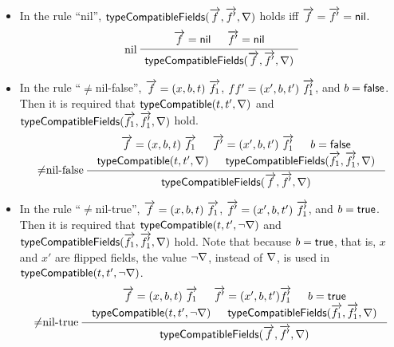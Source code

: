 \begin{itemize}
\begin{gather*}
{\begin{array}{c}
		\end{array}
		}	
	\end{gather*}
	\item In the rule ``nil'', ${\sf typeCompatibleFields}(\overrightarrow{f}, \overrightarrow{f'}, \nabla)$ holds iff $\overrightarrow{f} = \overrightarrow{f'} = {\sf nil}$. 
	\begin{gather*}
		\infer[nil]
		{\typecompatiblefields(\myvec{f}, \myvec{f'}, \flipped)}
		{
			\begin{array}{c}
				\myvec{f} = \nil \hspace{15pt} \myvec{f'} = \nil
			\end{array}
		}	
	\end{gather*}
	\item In the rule ``$\neq$nil-false'', $\overrightarrow{f} = (x, b, t)\ \overrightarrow{f_1}$, $ff' = (x', b, t')\ \overrightarrow{f'_1}$, and $b = {\sf false}$. Then it is required that ${\sf typeCompatible}(t, t', \nabla)$ and ${\sf typeCompatibleFields}(\overrightarrow{f_1}, \overrightarrow{f'_1}, \nabla)$ hold. 
	\begin{gather*}
		\infer[$\neq$nil-false]
		{\typecompatiblefields(\myvec{f}, \myvec{f'}, \flipped)}
		{
			\begin{array}{c}
				\myvec{f} = (x, b, t)\ \myvec{f_1} \hspace{15pt} \myvec{f'} = (x', b, t')\ \myvec{f'_1} \hspace{15pt} b = \lfalse \\
				\typecompatible(t, t', \flipped) \hspace{15pt}
				\typecompatiblefields(\myvec{f_1}, \myvec{f'_1}, \flipped)
			\end{array}
		}	
	\end{gather*}
	\item In the rule ``$\neq$nil-true'', $\overrightarrow{f} = (x, b, t)\ \overrightarrow{f_1}$, $\myvec{f'} = (x', b, t')\ \myvec{f'_1}$, and $b = {\sf true}$. Then it is required that ${\sf typeCompatible}(t, t', \neg \nabla)$ and ${\sf typeCompatibleFields}(\overrightarrow{f_1}, \overrightarrow{f'_1}, \nabla)$  hold. Note that because $b = {\sf true}$, that is, $x$ and $x'$ are flipped fields, the value $\neg \nabla$, instead of $\nabla$, is used in ${\sf typeCompatible}(t, t', \neg \nabla)$. 
	\begin{gather*}
		\infer[$\neq$nil-true]
		{\typecompatiblefields(\myvec{f}, \myvec{f'}, \flipped)}
		{
			\begin{array}{c}
				\myvec{f} = (x, b, t)\ \myvec{f_1} \hspace{15pt} \myvec{f'} = (x', b, t') \myvec{f'_1} \hspace{15pt} b = \ltrue \\
				\typecompatible(t, t', \neg \flipped) \hspace{15pt}
				\typecompatiblefields(\myvec{f_1}, \myvec{f'_1}, \flipped)
			\end{array}
		}	
	\end{gather*}
\end{itemize}

